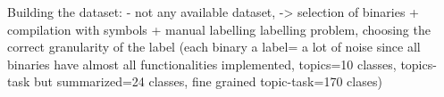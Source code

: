 




Building the dataset:
	- not any available dataset, -> selection of binaries + compilation with symbols 
	 + manual labelling
	labelling problem, choosing the correct granularity of the label (each binary a label= a lot of noise since all binaries have almost all functionalities implemented, topics=10 classes, topics-task but summarized=24 classes, fine grained topic-task=170 clases)
